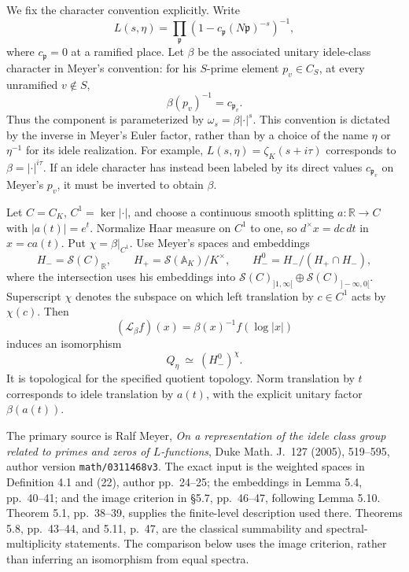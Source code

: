 We fix the character convention explicitly.  Write
\[
 L(s,\eta)=\prod_{\mathfrak p}
       (1-c_{\mathfrak p}(N\mathfrak p)^{-s})^{-1},
\]
where \(c_{\mathfrak p}=0\) at a ramified place.  Let
\(\beta\) be the associated unitary idele-class character
in Meyer's convention: for his \(S\)-prime element
\(p_v\in C_S\), at every unramified \(v\notin S\),
\[
                      \beta(p_v)^{-1}=c_{\mathfrak p_v}.
                                                               \tag{M22.1}
\]
Thus the component is parameterized by
\(\omega_s=\beta|\cdot|^s\).
This convention is dictated by the inverse in Meyer's
Euler factor, rather than by a choice of the name
\(\eta\) or \(\eta^{-1}\) for its idele realization.
For example, \(L(s,\eta)=\zeta_K(s+i\tau)\) corresponds
to \(\beta=|\cdot|^{i\tau}\).
If an idele character has instead been labeled by
its direct values \(c_{\mathfrak p_v}\) on Meyer's
\(p_v\), it must be inverted to obtain \(\beta\).

Let \(C=C_K\), \(C^1=\ker|\cdot|\), and choose a
continuous smooth splitting \(a:\mathbb R\to C\)
with \(|a(t)|=e^t\).
Normalize Haar measure on \(C^1\) to one, so
\(d^\times x=dc\,dt\) in \(x=ca(t)\).
Put \(\chi=\beta|_{C^1}\).
Use Meyer's spaces and embeddings
\[
 H_-=\mathcal S(C)_{\mathbb R},\qquad
 H_+=\mathcal S(\mathbb A_K)/K^\times,\qquad
 H_-^0=H_-/(H_+\cap H_-),
\]
where the intersection uses his embeddings into
\(\mathcal S(C)_{]1,\infty[}\oplus
  \mathcal S(C)_{]-\infty,0[}\).
Superscript \(\chi\) denotes the subspace on which
left translation by \(c\in C^1\) acts by \(\chi(c)\).
Then
\[
 (\mathcal L_\beta f)(x)=\beta(x)^{-1}f(\log|x|)
\]
induces an isomorphism
\[
              Q_\eta \ \simeq\ (H_-^0)^\chi.                  \tag{M22.2}
\]
It is topological for the specified quotient topology.
Norm translation by \(t\) corresponds to idele
translation by \(a(t)\), with the explicit unitary
factor \(\beta(a(t))\).

The primary source is Ralf Meyer, \emph{On a representation
of the idele class group related to primes and zeros of
\(L\)-functions}, Duke Math. J.~127 (2005), 519--595,
author version \texttt{math/0311468v3}.
The exact input is the weighted spaces in Definition 4.1
and (22), author pp.~24--25; the embeddings in Lemma 5.4,
pp.~40--41; and the image criterion in \S5.7, pp.~46--47,
following Lemma 5.10.  Theorem 5.1, pp.~38--39, supplies
the finite-level description used there.
Theorems 5.8, pp.~43--44, and 5.11, p.~47, are the
classical summability and spectral-multiplicity statements.
The comparison below uses the image criterion,
rather than inferring an isomorphism from equal spectra.

